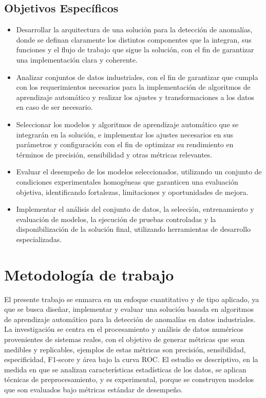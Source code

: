 \documentclass[11pt,a4paper,spanish]{book}
\numberwithin{equation}{chapter}
\numberwithin{figure}{chapter}
\begin{document}
\section{Objetivos Específicos}

\begin{itemize}

\item Desarrollar la arquitectura de una solución para la detección de anomalías, donde 
se definan claramente los distintos componentes que la integran, sus funciones y el 
flujo de trabajo que sigue la solución, con el fin de  garantizar una implementación 
clara y coherente.


\item Analizar conjuntos de datos industriales, con el fin de garantizar que cumpla 
con los requerimientos necesarios para la implementación de algoritmos de aprendizaje 
automático y realizar los ajustes y transformaciones a los datos en caso de ser necesario. 


\item Seleccionar los modelos y algoritmos de aprendizaje automático que se integrarán
en la solución, e implementar los ajustes necesarios en sus parámetros y configuración
con el fin de optimizar su rendimiento en términos de precisión, sensibilidad y otras
métricas relevantes.


\item Evaluar el desempeño de los modelos seleccionados, utilizando un conjunto de 
condiciones experimentales homogéneas que garanticen una evaluación objetiva, 
identificando fortalezas, limitaciones y oportunidades de mejora.


\item Implementar el análisis del conjunto de datos, la selección, entrenamiento y 
evaluación de modelos, la ejecución de pruebas controladas y la disponibilización de la 
solución final, utilizando herramientas de desarrollo especializadas. 

\end{itemize}


\chapter{Metodología de trabajo}


El presente trabajo se enmarca en un enfoque cuantitativo y de tipo aplicado, ya que se 
busca diseñar, implementar y evaluar una solución basada en algoritmos de aprendizaje 
automático para la detección de anomalías en datos industriales. La investigación se 
centra en el procesamiento y análisis de datos numéricos provenientes de sistemas reales,
con el objetivo de generar métricas que sean medibles y replicables, ejemplos de estas 
métricas son precisión, sensibilidad, especificidad, F1-score y área bajo la curva ROC.
El estudio es descriptivo, en la medida en que se analizan características estadísticas 
de los datos, se aplican técnicas de preprocesamiento, y es experimental, porque se 
construyen modelos que son evaluados bajo métricas estándar de desempeño. 
\end{document}
